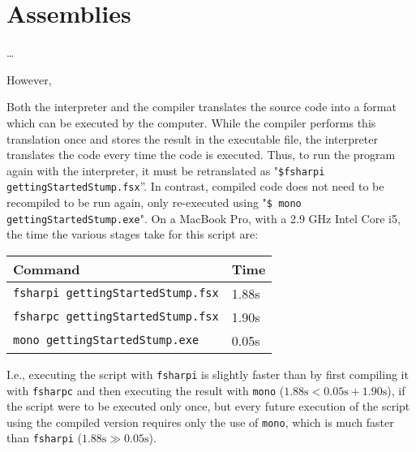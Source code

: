 \documentclass[springer.tex]{subfiles}
\begin{document}
\chapter{Assemblies}
\label{chap:assemblies}

\dots

However,  


Both the interpreter and the compiler translates the source code into a format which can be executed by the computer. While the compiler performs this translation once and stores the result in the executable file, the interpreter translates the code every time the code is executed. Thus, to run the program again with the interpreter, it must be retranslated as "\lstinline[language=console]{$fsharpi gettingStartedStump.fsx}''. %
In contrast, compiled code does not need to be recompiled to be run again, only re-executed using "\lstinline[language=console]{$ mono gettingStartedStump.exe}". %
On a MacBook Pro, with a 2.9 GHz Intel Core i5, the time the various stages take for this script are:
\begin{center}
  \begin{tabular}{|l|l|}
    \hline
    \rowcolor{headerRowColor} Command & Time\\
    \hline
    \lstinline[language=console]|fsharpi gettingStartedStump.fsx| & 1.88s\\
    \lstinline[language=console]|fsharpc gettingStartedStump.fsx| & 1.90s\\
    \lstinline[language=console]|mono gettingStartedStump.exe| & 0.05s\\
    \hline
\end{tabular}
\end{center}
I.e., executing the script with \lstinline[language=console]|fsharpi| is slightly faster than by first compiling it with \lstinline[language=console]|fsharpc| and then executing the result with \lstinline[language=console]|mono| ($1.88\text{s} < 0.05\text{s}+1.90\text{s}$), if the script were to be executed only once, but every future execution of the script using the compiled version requires only the use of \lstinline[language=console]|mono|, which is much faster than \lstinline[language=console]|fsharpi| ($1.88\text{s}\gg 0.05\text{s}$).
\end{document}
